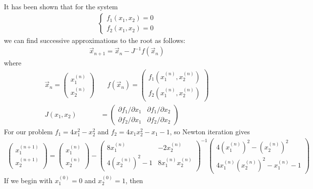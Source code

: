 \documentclass[12pt,a4paper]{article}
\begin{document}
It has been shown that for the system
\begin{align*}
\begin{cases}
f_1(x_1,x_2) = 0 \\
f_2(x_1,x_2) = 0
\end{cases}
\end{align*}
we can find successive approximations to the root as follows:
\begin{align*}
\vec{x}_{n+1} = \vec{x}_{n} - J^{-1}f(\vec{x}_{n})
\end{align*}
where 
\begin{align*}
\vec{x}_n = \begin{pmatrix}
x_{1}^{(n)} \\ x_{2}^{(n)}
\end{pmatrix} 
&\quad
f(\vec{x}_{n}) = \begin{pmatrix}
f_1(x_1^{(n)},x_2^{(n)}) \\ f_2(x_1^{(n)},x_2^{(n)})
\end{pmatrix}
\\
J(x_1,x_2) &= \begin{pmatrix}
\partial f_1/\partial x_1 & \partial f_1/\partial x_2 \\
\partial f_2/\partial x_1 & \partial f_2/\partial x_2
\end{pmatrix}
\end{align*}
For our problem $f_1 = 4x_1^2 - x_2^2$ and $f_2 = 4x_1x_2^2 - x_1 - 1$, so Newton iteration gives
\begin{align*}
\begin{pmatrix}
x_{1}^{(n+1)} \\ x_{2}^{(n+1)}
\end{pmatrix} 
=
\begin{pmatrix}
x_{1}^{(n)} \\ x_{2}^{(n)}
\end{pmatrix} 
-
\begin{pmatrix}
8x_1^{(n)} & -2x_2^{(n)} \\
4(x_2^{(n)})^2 - 1 & 8x_1^{(n)}x_2^{(n)}
\end{pmatrix}^{-1}
\begin{pmatrix}
4(x_1^{(n)})^2 - (x_2^{(n)})^2 \\ 4x_1^{(n)}(x_2^{(n)})^2 - x_1^{(n)} - 1
\end{pmatrix}
\end{align*}
If we begin with $x_1^{(0)} = 0$ and $x_2^{(0)} = 1$, then
\end{document}

